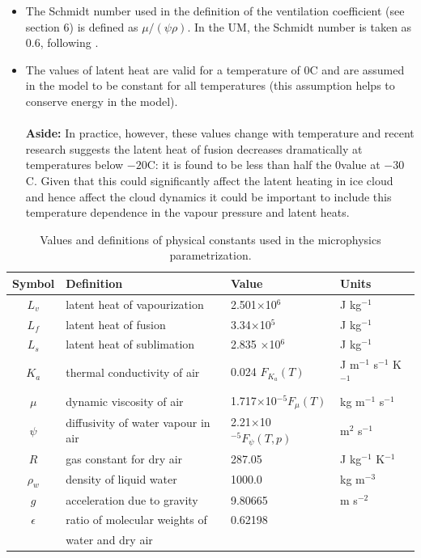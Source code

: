\documentclass{UMDP_article}
\begin{document}
\begin{itemize}
\item{The Schmidt number used in the definition of the ventilation
coefficient (see section 6) is defined as $\mu / (\psi \rho)$. In the UM, the
Schmidt number is taken as 0.6, following 
\cite{Rutledge:Hobbs:1983}.}
\item{The values of latent heat are valid for a temperature of 0\textdegree C 
and are assumed in the model to be constant for all temperatures  (this
assumption helps to conserve energy in the model).  \\
\\
\textbf{Aside:} In practice, however, these
values change with  temperature  and recent research \citep{Fukuta:Gramada:2003}
suggests the latent heat of fusion decreases dramatically at temperatures below
$-20$\textdegree C: it is found to be less than half the 0\textdegree value at
$ -30$\textdegree C. Given that this could significantly
affect the latent heating in ice cloud and hence affect the cloud dynamics it
could be important to include this temperature dependence in the vapour
pressure and latent heats.}
\end{itemize}

\begin{table}[ht!]
\begin{center}
\begin{tabular}{clll} \hline
 Symbol & Definition & Value & Units \\ \hline
$L_v$&latent heat of vapourization
& 2.501$\times$10$^6$ &J kg$^{-1}$  \\
$L_f$&latent heat of fusion
& 3.34$\times$10$^5$ & J kg$^{-1}$  \\
$L_s$&latent heat of sublimation
& 2.835 $\times$10$^6$ & J kg$^{-1}$  \\ 
$K_a$&thermal conductivity of air
& 0.024 $F_{K_a}(T)$ & J m$^{-1}$ s$^{-1}$ K$^{-1}$  \\
$\mu$&dynamic viscosity of air
& 1.717$\times$10$^{-5} F_{\mu}(T)$ & kg m$^{-1}$ s$^{-1}$  \\
$\psi$& diffusivity of water vapour in air
& 2.21$\times$10$^{-5} F_{\psi}(T,p)$ & m$^{2}$ s$^{-1}$  \\
$R$& gas constant for dry air
& 287.05 & J kg$^{-1}$ K$^{-1}$ \\
$\rho_w$ & density of liquid water & 1000.0 & kg m$^{-3}$ \\
$g$ & acceleration due to gravity & 9.80665 & m s$^{-2}$ \\
$\epsilon$ & ratio of molecular weights of  & 0.62198 & \\
& water and dry air & & \\
\hline
\end{tabular}
\end{center}
\caption{Values and definitions of physical constants used in
 the microphysics parametrization.}
\label{tab:mic_phys}
\end{table}
\end{document}
